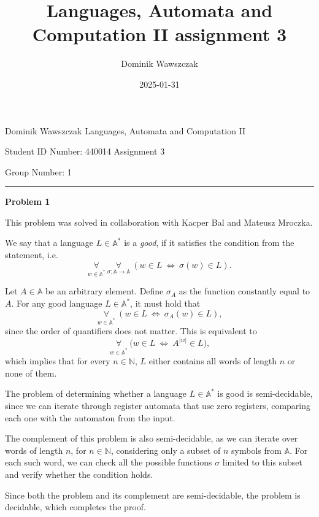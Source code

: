 \documentclass[12pt]{article}
\title{Languages, Automata and Computation II assignment 3}
\author{Dominik Wawszczak}
\date{2025-01-31}
\begin{document}
	\setlength{\parindent}{0 cm}
	
	Dominik Wawszczak \hfill Languages, Automata and Computation II
	
	Student ID Number: 440014 \hfill Assignment 3
	
	Group Number: 1
	
	\bigskip
	\hrule
	\bigskip
	
	\textbf{Problem 1}
	
	\medskip
	
	This problem was solved in collaboration with Kacper Bal and Mateusz
	Mroczka.
	
	\medskip
	
	We say that a language \(L \in \mathbb{A}^{*}\) is a \textit{good}, if it
	satisfies the condition from the statement, i.e.
	\[ \underset{w \in \mathbb{A}^{\ast}}{\forall} \
	\underset{\sigma : \mathbb{A} \to \mathbb{A}}{\forall} \ (w \in L \ \iff \
	\sigma(w) \in L) \text{.} \]
	
	\medskip
	
	Let \(A \in \mathbb{A}\) be an arbitrary element. Define \(\sigma_{A}\) as
	the function constantly equal to \(A\). For any good language \(L \in
	\mathbb{A}^{\ast}\), it must hold that
	\[ \underset{w \in \mathbb{A}^{\ast}}{\forall} \ (w \in L \ \iff \
	\sigma_{A}(w) \in L) \text{,} \]
	since the order of quantifiers does not matter. This is equivalent to
	\[ \underset{w \in \mathbb{A}^{\ast}}{\forall} \ \big( w \in L \ \iff \
	A^{|w|} \in L \big) \text{,} \]
	which implies that for every \(n \in \mathbb{N}\), \(L\) either contains all
	words of length \(n\) or none of them.
	
	\medskip
	
	The problem of determining whether a language \(L \in \mathbb{A}^{\ast}\) is
	good is semi-decidable, since we can iterate through register automata that
	use zero registers, comparing each one with the automaton from the input.
	
	\medskip
	
	The complement of this problem is also semi-decidable, as we can iterate
	over words of length \(n\), for \(n \in \mathbb{N}\), considering only a
	subset of \(n\) symbols from \(\mathbb{A}\). For each such word, we can
	check all the possible functions \(\sigma\) limited to this subset and
	verify whether the condition holds.
	
	\medskip
	
	Since both the problem and its complement are semi-decidable, the problem is
	decidable, which completes the proof.
\end{document}
